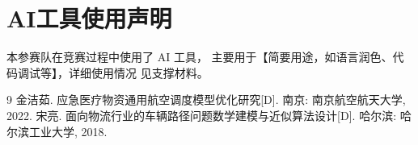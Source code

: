 \documentclass[withoutpreface,bwprint]{cumcmthesis} %
\begin{document}
\section{AI工具使用声明}
本参赛队在竞赛过程中使用了 AI 工具，
主要用于【简要用途，如语言润色、代码调试等】，详细使用情况
见支撑材料。

\begin{thebibliography}{9}%
    金洁茹.
    \newblock 应急医疗物资通用航空调度模型优化研究[D].
    \newblock 南京: 南京航空航天大学, 2022.
    宋亮.
    \newblock 面向物流行业的车辆路径问题数学建模与近似算法设计[D].
    \newblock 哈尔滨: 哈尔滨工业大学, 2018.
\end{thebibliography}
\end{document}
